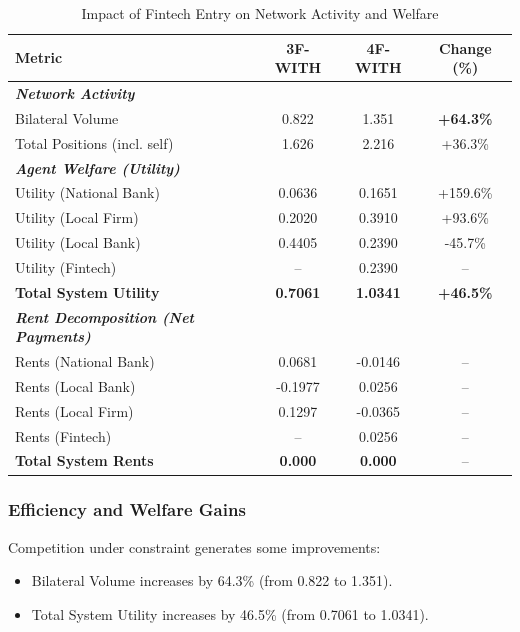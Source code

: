 \begin{table}[h]
\centering
\caption{Impact of Fintech Entry on Network Activity and Welfare}
\label{tab:fintech_impact}
\begin{tabular}{lccc}
\hline
\textbf{Metric} & \textbf{3F-WITH} & \textbf{4F-WITH} & \textbf{Change (\%)} \\ \hline
\textit{\textbf{Network Activity}} & & & \\
Bilateral Volume & 0.822 & 1.351 & \textbf{+64.3\%} \\
Total Positions (incl. self) & 1.626 & 2.216 & +36.3\% \\
\hline
\textit{\textbf{Agent Welfare (Utility)}} & & & \\
Utility (National Bank) & 0.0636 & 0.1651 & +159.6\% \\
Utility (Local Firm) & 0.2020 & 0.3910 & +93.6\% \\
Utility (Local Bank) & 0.4405 & 0.2390 & -45.7\% \\
Utility (Fintech) & -- & 0.2390 & -- \\ \hline
\textbf{Total System Utility} & \textbf{0.7061} & \textbf{1.0341} & \textbf{+46.5\%} \\
\hline
\textit{\textbf{Rent Decomposition (Net Payments)}} & & & \\
Rents (National Bank) & 0.0681 & -0.0146 & -- \\
Rents (Local Bank) & -0.1977 & 0.0256 & -- \\
Rents (Local Firm) & 0.1297 & -0.0365 & -- \\
Rents (Fintech) & -- & 0.0256 & -- \\ \hline
\textbf{Total System Rents} & \textbf{0.000} & \textbf{0.000} & -- \\
\hline
\end{tabular}
\end{table}

\subsubsection{Efficiency and Welfare Gains}

Competition under constraint generates some improvements:

\begin{itemize}
    \item Bilateral Volume increases by 64.3\% (from 0.822 to 1.351).
    \item Total System Utility increases by 46.5\% (from 0.7061 to 1.0341).
\end{itemize}

